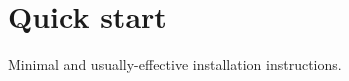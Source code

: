 \section{Quick start}
\label{sec:quickstart}

Minimal and usually-effective installation instructions.


